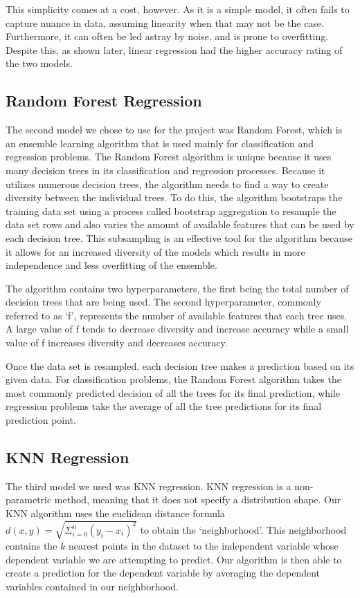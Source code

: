 \documentclass{article}
\begin{document}
This simplicity comes at a cost, however. As it is a simple model, it often fails to capture nuance in data, assuming linearity when that may not be the case. Furthermore, it can often be led astray by noise, and is prone to overfitting. Despite this, as shown later, linear regression had the higher accuracy rating of the two models.

\subsection{Random Forest Regression}
\label{randomforest}

The second model we chose to use for the project was Random Forest, which is an ensemble learning algorithm that is used mainly for classification and regression problems. The Random Forest algorithm is unique because it uses many decision trees in its classification and regression processes. Because it utilizes numerous decision trees, the algorithm needs to find a way to create diversity between the individual trees. To do this, the algorithm bootstraps the training data set using a process called bootstrap aggregation to resample the data set rows and also varies the amount of available features that can be used by each decision tree. This subsampling is an effective tool for the algorithm because it allows for an increased diversity of the models which results in more independence and less overfitting of the ensemble.

The algorithm contains two hyperparameters, the first being the total number of decision trees that are being used. The second hyperparameter, commonly referred to as ‘f’, represents the number of available features that each tree uses. A large value of f tends to decrease diversity and increase accuracy while a small value of f increases diversity and decreases accuracy. 

Once the data set is resampled, each decision tree makes a prediction based on its given data. For classification problems, the Random Forest algorithm takes the most commonly predicted decision of all the trees for its final prediction, while regression problems take the average of all the tree predictions for its final prediction point.

\subsection{KNN Regression}
\label{randomforest}

The third model we used was KNN regression. KNN regression is a non-parametric method, meaning that it does not specify a distribution shape. Our KNN algorithm uses the euclidean distance formula $ d(x,y) = \sqrt{\Sigma_{i=0}^n(y_i - x_i)^2}$ to obtain the ‘neighborhood’. This neighborhood contains the $k$ nearest points in the dataset to the independent variable whose dependent variable we are attempting to predict. Our algorithm is then able to create a prediction for the dependent variable by averaging the dependent variables contained in our neighborhood.
\end{document}
